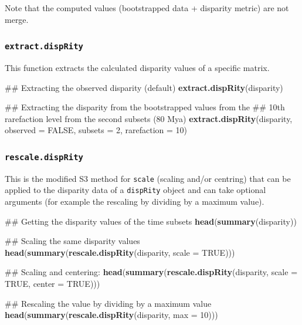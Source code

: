 \documentclass[]{book}
\newenvironment{Shaded}{\begin{snugshade}}{\end{snugshade}}
\newcommand{\KeywordTok}[1]{\textcolor[rgb]{0.13,0.29,0.53}{\textbf{#1}}}
\newcommand{\DataTypeTok}[1]{\textcolor[rgb]{0.13,0.29,0.53}{#1}}
\newcommand{\DecValTok}[1]{\textcolor[rgb]{0.00,0.00,0.81}{#1}}
\newcommand{\OtherTok}[1]{\textcolor[rgb]{0.56,0.35,0.01}{#1}}
\newcommand{\NormalTok}[1]{#1}
\theoremstyle{definition}
\theoremstyle{definition}
\theoremstyle{remark}
\begin{document}
Note that the computed values (bootstrapped data + disparity metric) are
not merge.

\subsubsection{\texorpdfstring{\texttt{extract.dispRity}}{extract.dispRity}}\label{extract.disprity}

This function extracts the calculated disparity values of a specific
matrix.

\begin{Shaded}
\begin{Highlighting}[]
\NormalTok{## Extracting the observed disparity (default)}
\KeywordTok{extract.dispRity}\NormalTok{(disparity)}

\NormalTok{## Extracting the disparity from the bootstrapped values from the}
\NormalTok{## 10th rarefaction level from the second subsets (80 Mya)}
\KeywordTok{extract.dispRity}\NormalTok{(disparity, }\DataTypeTok{observed =} \OtherTok{FALSE}\NormalTok{, }\DataTypeTok{subsets =} \DecValTok{2}\NormalTok{, }\DataTypeTok{rarefaction =} \DecValTok{10}\NormalTok{)}
\end{Highlighting}
\end{Shaded}

\subsubsection{\texorpdfstring{\texttt{rescale.dispRity}}{rescale.dispRity}}\label{rescale.disprity}

This is the modified S3 method for \texttt{scale} (scaling and/or
centring) that can be applied to the disparity data of a
\texttt{dispRity} object and can take optional arguments (for example
the rescaling by dividing by a maximum value).

\begin{Shaded}
\begin{Highlighting}[]
\NormalTok{## Getting the disparity values of the time subsets}
\KeywordTok{head}\NormalTok{(}\KeywordTok{summary}\NormalTok{(disparity))}

\NormalTok{## Scaling the same disparity values}
\KeywordTok{head}\NormalTok{(}\KeywordTok{summary}\NormalTok{(}\KeywordTok{rescale.dispRity}\NormalTok{(disparity, }\DataTypeTok{scale =} \OtherTok{TRUE}\NormalTok{)))}

\NormalTok{## Scaling and centering:}
\KeywordTok{head}\NormalTok{(}\KeywordTok{summary}\NormalTok{(}\KeywordTok{rescale.dispRity}\NormalTok{(disparity, }\DataTypeTok{scale =} \OtherTok{TRUE}\NormalTok{, }\DataTypeTok{center =} \OtherTok{TRUE}\NormalTok{)))}

\NormalTok{## Rescaling the value by dividing by a maximum value}
\KeywordTok{head}\NormalTok{(}\KeywordTok{summary}\NormalTok{(}\KeywordTok{rescale.dispRity}\NormalTok{(disparity, }\DataTypeTok{max =} \DecValTok{10}\NormalTok{)))}
\end{Highlighting}
\end{Shaded}
\end{document}
